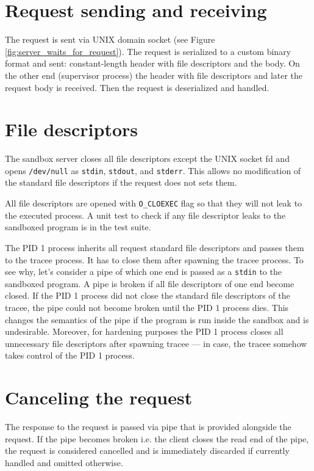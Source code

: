\documentclass[en]{pracamgr}
\begin{document}
\section{Request sending and receiving}

The request is sent via UNIX domain socket (see Figure \ref{fig:server_waits_for_request}). The request is serialized to a custom binary format and sent: constant-length header with file descriptors and the body. On the other end (supervisor process) the header with file descriptors and later the request body is received. Then the request is deserialized and handled.

\section{File descriptors}

The sandbox server closes all file descriptors except the UNIX socket fd and opens \texttt{/dev/null} as \texttt{stdin}, \texttt{stdout}, and \texttt{stderr}. This allows no modification of the standard file descriptors if the request does not sets them.

All file descriptors are opened with \texttt{O\_CLOEXEC} flag so that they will not leak to the executed process. A unit test to check if any file descriptor leaks to the sandboxed program is in the test suite.

The PID 1 process inherits all request standard file descriptors and passes them to the tracee process. It has to close them after spawning the tracee process. To see why, let's consider a pipe of which one end is passed as a \texttt{stdin} to the sandboxed program. A pipe is broken if all file descriptors of one end become closed. If the PID 1 process did not close the standard file descriptors of the tracee, the pipe could not become broken until the PID 1 process dies. This changes the semantics of the pipe if the program is run inside the sandbox and is undesirable. Moreover, for hardening purposes the PID 1 process closes all unnecessary file descriptors after spawning tracee --- in case, the tracee somehow takes control of the PID 1 process.

\section{Canceling the request}

The response to the request is passed via pipe that is provided alongside the request. If the pipe becomes broken i.e. the client closes the read end of the pipe, the request is considered cancelled and is immediately discarded if currently handled and omitted otherwise.
\end{document}
